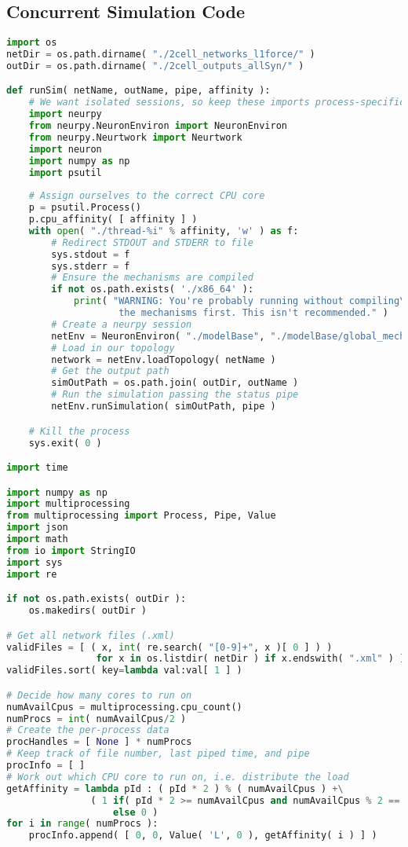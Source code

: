 \subsection*{Concurrent Simulation Code}
\begin{lstlisting}[caption={Code for running concurrent simulations from supplied network files}, label={ap:simCode}, language=Python]
import os 
netDir = os.path.dirname( "./2cell_networks_l1force/" )
outDir = os.path.dirname( "./2cell_outputs_allSyn/" )

def runSim( netName, outName, pipe, affinity ):
    # We want isolated sessions, so keep these imports process-specific
    import neurpy
    from neurpy.NeuronEnviron import NeuronEnviron
    from neurpy.Neurtwork import Neurtwork
    import neuron
    import numpy as np
    import psutil
    
    # Assign ourselves to the correct CPU core
    p = psutil.Process()
    p.cpu_affinity( [ affinity ] )
    with open( "./thread-%i" % affinity, 'w' ) as f:
        # Redirect STDOUT and STDERR to file
        sys.stdout = f
        sys.stderr = f
        # Ensure the mechanisms are compiled
        if not os.path.exists( './x86_64' ):
            print( "WARNING: You're probably running without compiling\
                    the mechanisms first. This isn't recommended." )
        # Create a neurpy session
        netEnv = NeuronEnviron( "./modelBase", "./modelBase/global_mechanisms" )
        # Load in our topology
        network = netEnv.loadTopology( netName )
        # Get the output path
        simOutPath = os.path.join( outDir, outName )
        # Run the simulation passing the status pipe
        netEnv.runSimulation( simOutPath, pipe )

    # Kill the process
    sys.exit( 0 )

import time

import numpy as np
import multiprocessing
from multiprocessing import Process, Pipe, Value
import json
import math
from io import StringIO
import sys
import re

if not os.path.exists( outDir ):
    os.makedirs( outDir )

# Get all network files (.xml)
validFiles = [ ( x, int( re.search( "[0-9]+", x )[ 0 ] ) )
                for x in os.listdir( netDir ) if x.endswith( ".xml" ) ]
validFiles.sort( key=lambda val:val[ 1 ] )

# Decide how many cores to run on
numAvailCpus = multiprocessing.cpu_count()
numProcs = int( numAvailCpus/2 ) 
# Create the per-process data
procHandles = [ None ] * numProcs
# Keep track of file number, last piped time, and pipe
procInfo = [ ]
# Work out which CPU core to run on, i.e. distribute the load
getAffinity = lambda pId : ( pId * 2 ) % ( numAvailCpus ) +\
               ( 1 if( pId * 2 >= numAvailCpus and numAvailCpus % 2 == 0 )\
                   else 0 )
for i in range( numProcs ):
    procInfo.append( [ 0, 0, Value( 'L', 0 ), getAffinity( i ) ] )


\end{lstlisting}
